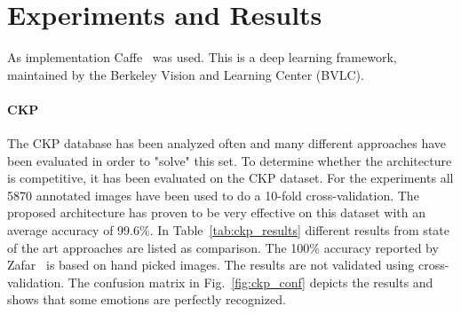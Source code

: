 \section{Experiments and Results}
\label{sec:experiments}


As implementation Caffe~\cite{jia2014caffe} was used. This is a deep learning framework, maintained by the Berkeley Vision and Learning Center (BVLC).


\paraV
\paragraph{\textbf{CKP}}
The CKP database has been analyzed often and many different approaches have been evaluated in order to "solve" this set.
To determine whether the architecture is competitive, it has been evaluated on the CKP dataset. For the experiments all 5870 annotated images have been used to do a 10-fold cross-validation. The proposed architecture has proven to be very effective on this dataset with an average accuracy of 99.6\%. In Table~\ref{tab:ckp_results} different results from state of the art approaches are listed as comparison. The 100\% accuracy reported by Zafar~\cite{6743520} is based on hand picked images. The results are not validated using cross-validation. The confusion matrix in Fig.~\ref{fig:ckp_conf} depicts the results and shows that some emotions are perfectly recognized.

\begin{table}[b]
\centering
\caption{The CKP database has been very well analyzed and the best possible recognition accuracy has been achieved by Aliya Zafar. It is noteworthy that the samples he used for training are not randomly selected and no cross-validation has been applied. Evaluating this database provides information whether the proposed approach can compete with those results.}
\label{tab:ckp_results}

\end{table}


